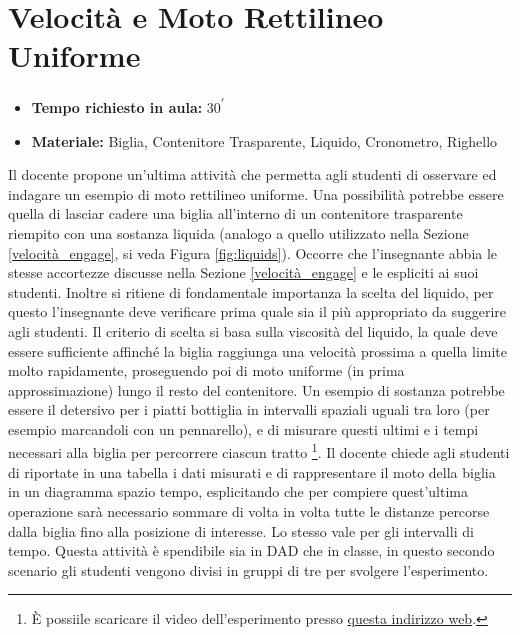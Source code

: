 \documentclass{report} \usepackage[T1]{fontenc} \usepackage[italian]{babel}
\begin{document}
\section{Velocità e Moto Rettilineo Uniforme}

\begin{itemize}
\item \textbf{Tempo richiesto in aula:} 30\textsuperscript{$\prime$}
\item \textbf{Materiale:} Biglia, Contenitore Trasparente, Liquido, Cronometro, Righello
\end{itemize}

Il docente propone un’ultima attività che permetta agli studenti di osservare
ed indagare un esempio di moto rettilineo uniforme. Una possibilità potrebbe
essere quella di lasciar cadere una biglia all’interno di un contenitore
trasparente riempito con una sostanza liquida (analogo a quello utilizzato
nella Sezione \ref{velocità_engage}, si veda Figura \ref{fig:liquids}).
Occorre che l’insegnante abbia
le stesse accortezze discusse nella Sezione \ref{velocità_engage} e
le espliciti ai suoi studenti. Inoltre si ritiene di fondamentale
importanza la scelta del liquido, per questo
l’insegnante deve verificare prima quale sia il più appropriato da suggerire
agli studenti. Il criterio di scelta si basa sulla viscosità del liquido, la
quale deve essere sufficiente affinché la biglia raggiunga una velocità
prossima a quella limite molto rapidamente, proseguendo poi di moto uniforme
(in prima approssimazione)
lungo il resto del contenitore. Un esempio di sostanza potrebbe essere il
detersivo per i piatti bottiglia in intervalli spaziali uguali tra loro (per esempio marcandoli con
un pennarello), e di misurare questi ultimi e i tempi necessari
alla biglia per percorrere ciascun tratto
\footnote{\`E possiile scaricare il video dell'esperimento presso
          \href{https://github.com/savaroskij/PED1/blob/master/progetto_finale/media/video/biglia_detersivo.mp4?raw=true}{questa indirizzo web}.
         }.
Il docente chiede agli studenti di riportate in una tabella i dati
misurati e di rappresentare il moto della biglia in un diagramma
spazio tempo, esplicitando che per compiere quest'ultima operazione
sarà necessario sommare di volta in volta tutte le distanze percorse
dalla biglia fino alla posizione di interesse. Lo stesso vale per
gli intervalli di tempo.
Questa attività è
spendibile sia in DAD che in classe, in questo secondo scenario gli studenti
vengono divisi in gruppi di tre per svolgere l’esperimento.
\end{document}
